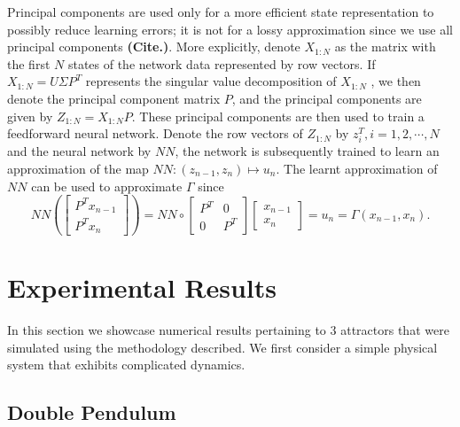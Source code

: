 \documentclass[a4paper,12pt,twoside]{report}
\begin{document}
Principal components are used only for a more efficient state representation to possibly reduce learning errors; it is not for a lossy approximation since we use all principal components \textbf{(Cite.)}.
More explicitly, denote $X_{1:N}$ as the matrix with the first $N$ states of the network data represented by row vectors. If $X_{1:N}=U\Sigma P^T$ represents the singular value decomposition of $X_{1:N}$ , we then denote the principal component matrix $P$, and the principal components are given by 
 $Z_{1:N}=X_{1:N}P.$
These principal components are then used to train a feedforward neural network. Denote the row vectors of $Z_{1:N}$ by 
$z_i^T, i=1,2,\cdots,N$ and the neural network by $NN$, the network is subsequently trained to learn an approximation of the map
$NN: (z_{n-1},z_n) \mapsto  u_n.
$
The learnt approximation of $NN$ can be used to approximate $\Gamma$ since 
$$
NN\left( \begin{bmatrix} 
P^Tx_{n-1} \\
P^Tx_n
\end{bmatrix}
\right) = NN \circ 
\begin{bmatrix}
P^T & 0 \\
0 & P^T 
\end{bmatrix}\begin{bmatrix}
x_{n-1}\\
x_n
\end{bmatrix} = u_n = \Gamma(x_{n-1},x_n).
$$


\section{Experimental Results}
In this section we showcase numerical results pertaining to 3 attractors that were simulated using the methodology described. We first consider a simple physical system that exhibits complicated dynamics.
\subsection{Double Pendulum}
\end{document}
